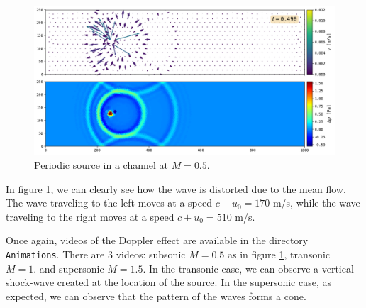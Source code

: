\documentclass[11 pt]{article}
\begin{document}
\begin{figure}[H]
    \centering
    \includegraphics[width=\textwidth]{../figures/doppler_1.png}
    \caption{Periodic source in a channel at $M=0.5$.}
    \label{fig:doppler_transonic}
\end{figure}

In figure \ref{fig:doppler_transonic}, we can clearly see how the wave is distorted due to the mean flow. The wave traveling to the left moves at a speed $c-u_0=170$ m/s, while the wave traveling to the right moves at a speed $c+u_0=510$ m/s.

Once again, videos of the Doppler effect are available in the directory \texttt{Animations}. There are 3 videos: subsonic $M=0.5$ as in figure \ref{fig:doppler_transonic}, transonic $M=1.$ and supersonic $M=1.5$. In the transonic case, we can observe a vertical shock-wave created at the location of the source. In the supersonic case, as expected, we can observe that the pattern of the waves forms a cone.


\nocite{*}
\printbibliography
\end{document}
